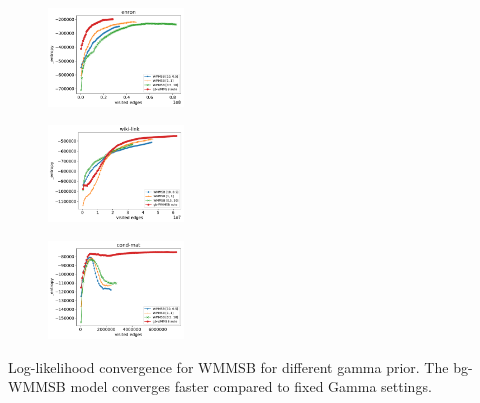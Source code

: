 
\begin{subfigure}
     \centering
         \includegraphics[width=0.32\textwidth]{warm2/enron_fig__entropy}
\end{subfigure}
\begin{subfigure}
         \centering
      \includegraphics[width=0.32\textwidth]{warm2/wiki-link_fig__entropy}
\end{subfigure}
\begin{subfigure}
         \centering
      \includegraphics[width=0.32\textwidth]{warm2/cond-mat_fig__entropy}
\end{subfigure}
\caption{Log-likelihood convergence for WMMSB for different gamma prior. The bg-WMMSB model converges faster compared to fixed Gamma settings.}
